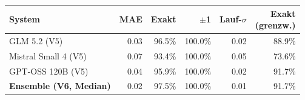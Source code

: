 \begin{tabular}{lrrrrr}
\toprule
System & MAE & Exakt & $\pm$1 & Lauf-$\sigma$ & \makecell{Exakt\\(grenzw.)} \\
\midrule
GLM 5.2 (V5) & 0.03 & 96.5\% & 100.0\% & 0.02 & 88.9\% \\
Mistral Small 4 (V5) & 0.07 & 93.4\% & 100.0\% & 0.05 & 73.6\% \\
GPT-OSS 120B (V5) & 0.04 & 95.9\% & 100.0\% & 0.02 & 91.7\% \\
\midrule
\textbf{Ensemble (V6, Median)} & 0.02 & 97.5\% & 100.0\% & 0.01 & 91.7\% \\
\bottomrule
\end{tabular}